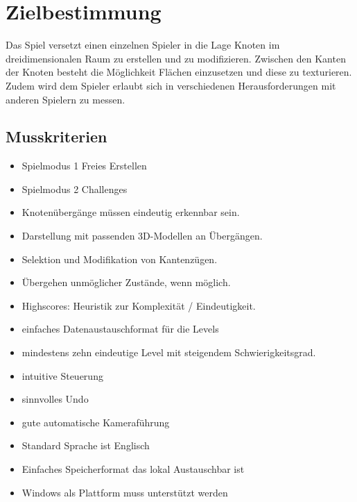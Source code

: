 \chapter{Zielbestimmung}

Das Spiel versetzt einen einzelnen Spieler in die Lage Knoten im dreidimensionalen Raum zu erstellen und zu modifizieren. Zwischen den Kanten der Knoten besteht die Möglichkeit Flächen einzusetzen und diese zu texturieren. Zudem wird dem Spieler erlaubt sich in verschiedenen Herausforderungen mit anderen Spielern zu messen.\\


\section{Musskriterien}

\begin{itemize}

	\item Spielmodus 1 Freies Erstellen
	
	\item Spielmodus 2 Challenges
	
	\item Knotenübergänge müssen eindeutig erkennbar sein.
	
	\item Darstellung mit passenden 3D-Modellen an Übergängen.
	
	\item Selektion und Modifikation von Kantenzügen.
	
	\item Übergehen unmöglicher Zustände, wenn möglich.
	
	\item Highscores: Heuristik zur Komplexität / Eindeutigkeit.
	
	\item einfaches Datenaustauschformat für die Levels
	
	\item mindestens zehn eindeutige Level mit steigendem Schwierigkeitsgrad.
	
	\item intuitive Steuerung
	
	\item sinnvolles Undo
	
	\item gute automatische Kameraführung
	\item Standard Sprache ist Englisch
	

	\item  Einfaches Speicherformat das lokal Austauschbar ist
	
	\item Windows als Plattform muss unterstützt werden
	
\end{itemize}

